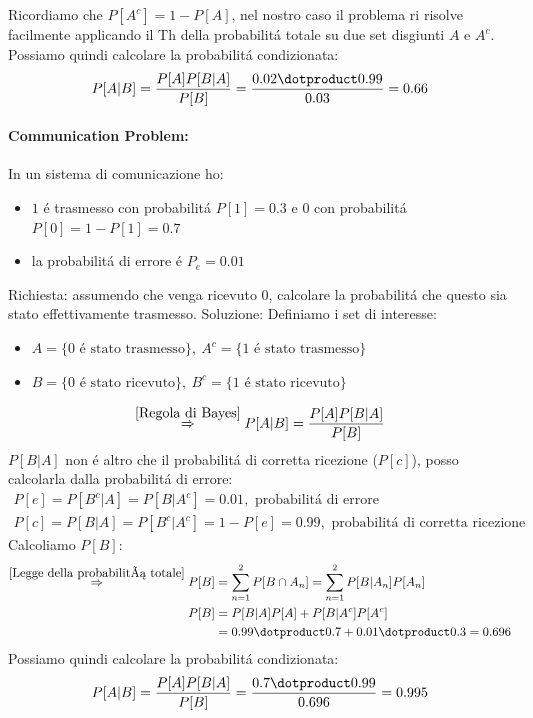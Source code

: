                 Ricordiamo che $P[A^c] = 1-P[A]$, nel nostro caso il problema ri risolve facilmente applicando il Th della probabilitá totale su due set disgiunti 
                $A$ e $A^c$. Possiamo quindi calcolare la probabilitá condizionata:
                \[
                    P[A|B] = \frac{P[A]P[B|A]}{P[B]} = \frac{0.02 \dotproduct 0.99}{0.03} = 0.66    
                \]

            \paragraph{Communication Problem:} In un sistema di comunicazione ho:
                \begin{itemize}
                    \item {$1$ é trasmesso con probabilitá $P[1] = 0.3$ e $0$ con probabilitá $P[0] = 1-P[1] = 0.7$}
                    \item {la probabilitá di errore é $P_e = 0.01$}
                \end{itemize}
                Richiesta: assumendo che venga ricevuto $0$, calcolare la probabilitá che questo sia stato effettivamente trasmesso.
                Soluzione: Definiamo i set di interesse:
                \begin{itemize}
                    \item {$A = \{0\text{ é stato trasmesso}\},\ A^c = \{1 \text{ é stato trasmesso}\}$}
                    \item {$B = \{0\text{ é stato ricevuto}\},\ B^c = \{1 \text{ é stato ricevuto}\}$}
                \end{itemize}
                \[
                    \overset{\ref{Regola di Bayes}}{\Rightarrow} P[A|B] = \frac{P[A]P[B|A]}{P[B]}    
                \]                           
                $P[B|A]$ non é altro che il probabilitá di corretta ricezione ($P[c]$), posso calcolarla dalla probabilitá di errore:
                \begin{gather}
                    P[e] = P[B^c|A] = P[B|A^c] = 0.01, \text{ probabilitá di errore} \nonumber \\
                    P[c] = P[B|A] = P[B^c|A^c] = 1-P[e]= 0.99, \text{ probabilitá di corretta ricezione}\nonumber 
                \end{gather}
                Calcoliamo $P[B]$:
                \begin{align}
                    \overset{\ref{Legge della probabilitá totale}}{\Rightarrow} P[B] &= \sum_{n=1}^{2} P[B\cap A_n] = \sum_{n=1}^{2} P[B|A_n] P[A_n] \nonumber \\
                    P[B] &= P[B|A]P[A] + P[B|A^c]P[A^c] \nonumber \\
                         &= 0.99\dotproduct 0.7 + 0.01 \dotproduct 0.3 = 0.696 \nonumber       
                \end{align}
                Possiamo quindi calcolare la probabilitá condizionata:
                \[
                    P[A|B] = \frac{P[A]P[B|A]}{P[B]} = \frac{0.7 \dotproduct 0.99}{0.696} = 0.995    
                \]
